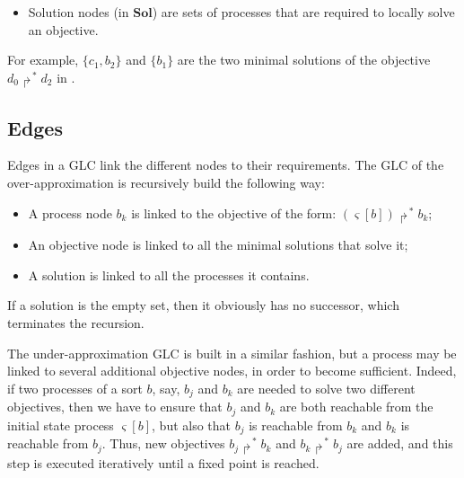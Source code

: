 \documentclass{movep}
\def\pref{\prettyref}
\newcommand{\PHfrappeB}{\Rsh}
\newcommand{\PHobjectif}[2]{\mbox{$#1\PHfrappeB^*\!#2$}}
\newcommand{\PHobj}{\PHobjectif}
\def\ctx{\varsigma}
\newcommand{\Sol}{\mathbf{Sol}}
\def\PHget#1#2{{#1[#2]}}
\def\ctx{\varsigma}
\newcounter{la}
\begin{document}
\begin{itemize}
  \item 
Solution nodes (in $\Sol$) are sets of processes that are required to locally solve an objective.
\end{itemize}
For example, $\{ c_1, b_2 \}$ and $\{ b_1 \}$ are the two minimal solutions of
the objective $\PHobj{d_0}{d_2}$ in \pref{fig:ph}.

\subsection{Edges}

Edges in a GLC link the different nodes to their requirements.
The GLC of the over-approximation is recursively build the following way:
\begin{itemize}
  \item A process node $b_k$ is linked to the objective of the form: $\PHobj{(\PHget{\ctx}{b})}{b_k}$;
  \item An objective node is linked to all the minimal solutions that solve it;
  \item A solution is linked to all the processes it contains.
\end{itemize}
If a solution is the empty set, then it obviously has no successor, which terminates the recursion.

The under-approximation GLC is built in a similar fashion,
but a process may be linked to several additional objective nodes, in order to become sufficient.
Indeed, if two processes of a sort $b$, say, $b_j$ and $b_k$ are needed to solve
two different objectives, %
then we have to ensure that
$b_j$ and $b_k$ are both reachable from the initial state process $\PHget{\ctx}{b}$,
but also that $b_j$ is reachable from $b_k$ and $b_k$ is reachable from $b_j$.
Thus, new objectives $\PHobj{b_j}{b_k}$ and $\PHobj{b_k}{b_j}$ are added,
and this step is executed iteratively until a fixed point is reached.
\end{document}
